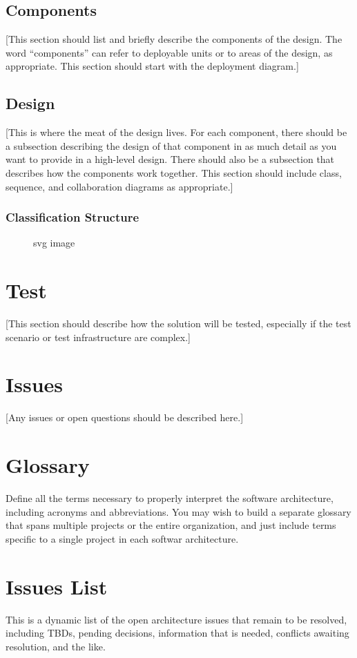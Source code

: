 \documentclass[12pt,oneside,letterpaper]{article}
\begin{document}
\subsection{Components}
[This section should list and briefly describe the components of the design.  The word ``components'' can refer to deployable units or to areas of the design, as appropriate. This section should start with the deployment diagram.]

\subsection{Design}
[This is where the meat of the design lives.  For each component, there should be a subsection describing the design of that component in as much detail as you want to provide in a high-level design.  There should also be a subsection that describes how the components work together. This section should include class, sequence, and collaboration diagrams as appropriate.]

\subsubsection{Classification Structure}
\begin{figure}[htbp]
  \centering
  
  \caption{svg image}
\end{figure}

\section{Test}
[This section should describe how the solution will be tested, especially if the test scenario or test infrastructure are complex.]

\section{Issues}
[Any issues or open questions should be described here.]

\appendix
\section{Glossary}
Define all the terms necessary to properly interpret the software architecture, including acronyms and abbreviations. You may wish to build a separate glossary that spans multiple projects or the entire organization, and just include terms specific to a single project in each softwar architecture.

\section{Issues List}
This is a dynamic list of the open architecture issues that remain to be resolved, including TBDs, pending decisions, information that is needed, conflicts awaiting resolution, and the like.
\end{document}
